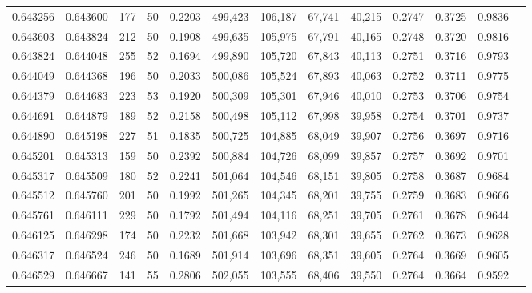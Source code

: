 \begin{tabular}{rrrrrrrrrrrrr}
0.643256 & 0.643600 &   177 &  50 &                                     0.2203 & 499,423 & 106,187 &  67,741 &  40,215 & 0.2747 & 0.3725 & 0.9836 \\
0.643603 & 0.643824 &   212 &  50 &                                     0.1908 & 499,635 & 105,975 &  67,791 &  40,165 & 0.2748 & 0.3720 & 0.9816 \\
0.643824 & 0.644048 &   255 &  52 &                                     0.1694 & 499,890 & 105,720 &  67,843 &  40,113 & 0.2751 & 0.3716 & 0.9793 \\
0.644049 & 0.644368 &   196 &  50 &                                     0.2033 & 500,086 & 105,524 &  67,893 &  40,063 & 0.2752 & 0.3711 & 0.9775 \\
0.644379 & 0.644683 &   223 &  53 &                                     0.1920 & 500,309 & 105,301 &  67,946 &  40,010 & 0.2753 & 0.3706 & 0.9754 \\
0.644691 & 0.644879 &   189 &  52 &                                     0.2158 & 500,498 & 105,112 &  67,998 &  39,958 & 0.2754 & 0.3701 & 0.9737 \\
0.644890 & 0.645198 &   227 &  51 &                                     0.1835 & 500,725 & 104,885 &  68,049 &  39,907 & 0.2756 & 0.3697 & 0.9716 \\
0.645201 & 0.645313 &   159 &  50 &                                     0.2392 & 500,884 & 104,726 &  68,099 &  39,857 & 0.2757 & 0.3692 & 0.9701 \\
0.645317 & 0.645509 &   180 &  52 &                                     0.2241 & 501,064 & 104,546 &  68,151 &  39,805 & 0.2758 & 0.3687 & 0.9684 \\
0.645512 & 0.645760 &   201 &  50 &                                     0.1992 & 501,265 & 104,345 &  68,201 &  39,755 & 0.2759 & 0.3683 & 0.9666 \\
0.645761 & 0.646111 &   229 &  50 &                                     0.1792 & 501,494 & 104,116 &  68,251 &  39,705 & 0.2761 & 0.3678 & 0.9644 \\
0.646125 & 0.646298 &   174 &  50 &                                     0.2232 & 501,668 & 103,942 &  68,301 &  39,655 & 0.2762 & 0.3673 & 0.9628 \\
0.646317 & 0.646524 &   246 &  50 &                                     0.1689 & 501,914 & 103,696 &  68,351 &  39,605 & 0.2764 & 0.3669 & 0.9605 \\
0.646529 & 0.646667 &   141 &  55 &                                     0.2806 & 502,055 & 103,555 &  68,406 &  39,550 & 0.2764 & 0.3664 & 0.9592 \\

\end{tabular}
